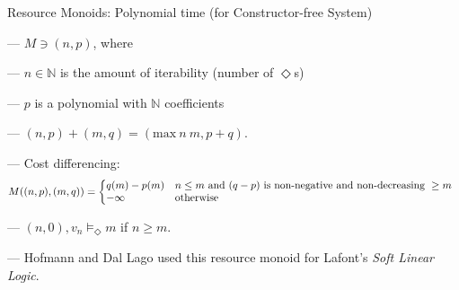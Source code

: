 \documentclass[xetex,serif,mathserif,aspectratio=169]{beamer}
\newcommand{\youtem}{\quad \textcolor{titlered!80}{---} \quad}
\newcommand{\HEAD}[1]{\textcolor{titlered}{#1}}
\begin{document}
\begin{frame}
  \HEAD{Resource Monoids: } Polynomial time (for Constructor-free System)

  \bigskip

  \youtem $M \ni (n, p)$, where \\

  \smallskip

  \quad \youtem $n \in \mathbb{N}$ is the amount of iterability (number of $\Diamond$s)

  \smallskip

  \quad \youtem $p$ is a polynomial with $\mathbb{N}$ coefficients

  \smallskip

  \quad \youtem $(n,p)+(m,q) = (\mathrm{max}~n~m,p+q)$.

  \smallskip

  \quad \youtem Cost differencing:
  \begin{displaymath}
    M((n,p),(m,q)) = \left\{\begin{array}{@{}ll}
                              q(m) - p(m) & n \leq m\textrm{ and }(q-p)\textrm{ is non-negative and non-decreasing }\geq m \\
                              -\infty      & \textrm{otherwise}
                            \end{array}\right.
                        \end{displaymath}

  \smallskip

  \youtem $(n, 0), v_n \models_\Diamond m$ if $n \geq m$.

  \smallskip

  \youtem Hofmann and Dal Lago used this resource monoid for Lafont's \emph{Soft Linear Logic}.

\end{frame}




\end{document}
